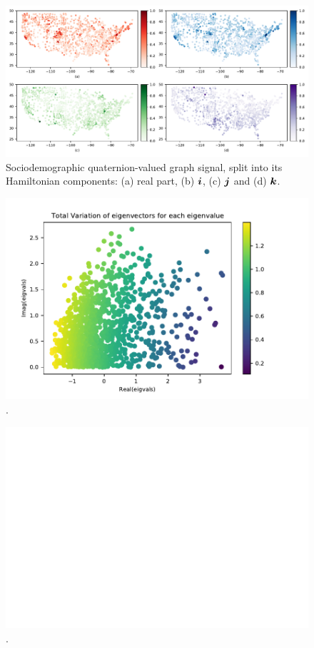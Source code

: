\begin{figure}
	\centering
	\includegraphics[width=0.95\linewidth]{thesis/Figures/us_signal.pdf}
	\caption{Sociodemographic quaternion-valued graph signal, split into its Hamiltonian components: (a) real part, (b) $\boldsymbol{i}$, (c) $\boldsymbol{j}$ and (d) $\boldsymbol{k}$.}
	\label{fig:us_signal}
\end{figure}

\begin{figure}
	\centering
	\includegraphics[width=0.7\linewidth]{thesis/Figures/us_counties_qgsp_tv1.pdf}
	\caption{.}
	\label{fig:us_counties_qgsp_tv1}
\end{figure}

\begin{figure}
	\centering
	\includegraphics[width=0.7\linewidth]{thesis/Figures/us_counties_qgsp_spectrumsig.pdf}
	\caption{.}
	\label{fig:us_counties_qgsp_spectrumsig}
\end{figure}

